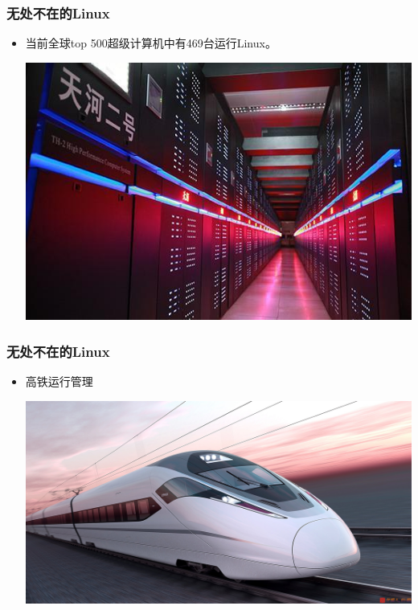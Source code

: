 \documentclass[xcolor=svgnames,presentation]{beamer}
\begin{document}
\begin{frame}
\frametitle{无处不在的Linux}
\label{sec-2-4-3}
\begin{itemize}

\item 当前全球top 500超级计算机中有469台运行Linux。
\label{sec-2-4-3-1}%
\begin{center}
\includegraphics[width=.9\linewidth]{img/tianhe.jpg}
\end{center}

\end{itemize} %
\end{frame}
\begin{frame}
\frametitle{无处不在的Linux}
\label{sec-2-4-4}
\begin{itemize}

\item 高铁运行管理
\label{sec-2-4-4-1}%
\begin{center}
\includegraphics[width=.9\linewidth]{img/train.jpg}
\end{center}

\end{itemize} %
\end{frame}
\end{document}
